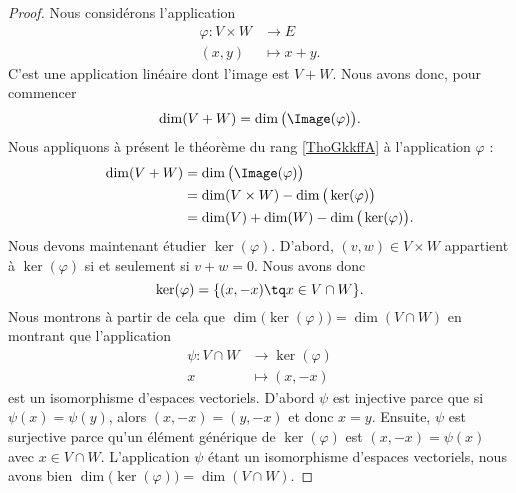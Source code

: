\begin{proof}
    Nous considérons l'application 
    \begin{equation}
        \begin{aligned}
            \varphi\colon V\times W&\to E \\
            (x,y)&\mapsto x+y. 
        \end{aligned}
    \end{equation}
    C'est une application linéaire dont l'image est \( V+W\). Nous avons donc, pour commencer
    \begin{equation}
        \dim(V+W)=\dim\big( \Image(\varphi) \big).
    \end{equation}
    Nous appliquons à présent le théorème du rang \ref{ThoGkkffA} à l'application \( \varphi\) :
    \begin{subequations}
        \begin{align}
            \dim(V+W)&=\dim\big( \Image(\varphi) \big)\\
            &=\dim(V\times W)- \dim\big( \ker(\varphi) \big)\\
            &=\dim(V)+\dim(W)-\dim\big( \ker(\varphi) \big).
        \end{align}
    \end{subequations}
    Nous devons maintenant étudier \( \ker(\varphi)\). D'abord, \( (v,w)\in V\times W\) appartient à \( \ker(\varphi)\) si et seulement si \( v+w=0\). Nous avons donc
    \begin{equation}
        \ker(\varphi)=\{ (x,-x)\tq x\in V\cap W \}.
    \end{equation}
    Nous montrons à partir de cela que \( \dim\big( \ker(\varphi) \big)=\dim(V\cap W)\) en montrant que l'application
    \begin{equation}
        \begin{aligned}
            \psi\colon V\cap W&\to \ker(\varphi) \\
            x&\mapsto (x,-x) 
        \end{aligned}
    \end{equation}
    est un isomorphisme d'espaces vectoriels. D'abord \( \psi\) est injective parce que si \( \psi(x)=\psi(y)\), alors \( (x,-x)=(y,-x)\) et donc \( x=y\). Ensuite, \( \psi\) est surjective parce qu'un élément générique de \( \ker(\varphi)\) est \( (x,-x)=\psi(x)\) avec \( x\in V\cap W\). L'application \( \psi\) étant un isomorphisme d'espaces vectoriels, nous avons bien \( \dim\big( \ker(\varphi) \big)=\dim(V\cap W)\).
\end{proof}

